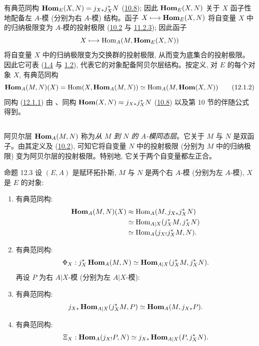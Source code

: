 有典范同构
$\operatorname{\mathbf{Hom}}_E(X,N)=j_{X\ast}j^{\ast}_XN$
(\hyperref[IV.cor10.8]{10.8}); 因此 $\operatorname{\mathbf{Hom}}_E(X,N)$ 关于 $X$ 函子性地配备左 $A$-模 (分别为右 $A$-模) 结构。函子 $X\longmapsto\operatorname{\mathbf{Hom}}_E(X,N)$ 将自变量 $X$ 中的归纳极限变为 $A$-模的投射极限 (\hyperref[IV.subsec10.2]{10.2} 与 \hyperref[IV.subsubsec11.2.3]{11.2.3}); 因此函子
$$
X\longmapsto \operatorname{Hom}_A(M,\operatorname{\mathbf{Hom}}_E(X,N))
$$
将自变量 $X$ 中的归纳极限\pageoriginale 变为交换群的投射极限, 从而变为底集合的投射极限。因此它可表 (\hyperref[IV.prop1.4]{1.4} 与 \hyperref[IV.theo1.2]{1.2}), 代表它的对象配备阿贝尔层结构。按定义, 对 $E$ 的每个对象 $X$, 有典范同构
\begin{equation*}
\operatorname{\mathbf{Hom}}_A(M,N)(X)=\operatorname{Hom}(X,\operatorname{\mathbf{Hom}}_A(M,N))\simeq
\operatorname{Hom}_A(M,\operatorname{\mathbf{Hom}}(X,N))\tag{12.1.2}
\end{equation*}
同构 (\hyperref[IV.eq12.1.1]{12.1.1}) 由 、同构 $\operatorname{\mathbf{Hom}}(X,N)\approx j_{X\ast}j^{\ast}_XN$ (\hyperref[IV.cor10.8]{10.8}) 以及第 10 节的伴随公式得到。

\setcounter{subsection}{1}
\subsection{}
阿贝尔层 $\operatorname{\mathbf{Hom}}_A(M,N)$ 称为\emph{从 $M$ 到 $N$ 的 $A$-模同态层}。它关于 $M$ 与 $N$ 是双函子。由其定义及 (\hyperref[IV.subsec10.2]{10.2}), 可知它将自变量 $N$ 中的投射极限 (分别为 $M$ 中的归纳极限) 变为阿贝尔层的投射极限。特别地, 它关于两个自变量都左正合。

\begin{enonce*}{命题 12.3}
设 $(E,A)$ 是赋环拓扑斯, $M$ 与 $N$ 是两个右 $A$-模 (分别为左 $A$-模), $X$ 是 $E$ 的对象:
\begin{enumerate}
\renewcommand{\theenumi}{\alph{enumi}}
\renewcommand{\labelenumi}{\theenumi)}
\item 有典范同构:
$$
\begin{aligned}
\operatorname{\mathbf{Hom}}_A(M,N)(X)&\approx \operatorname{Hom}_A(M, j_{X\ast}j^{\ast}_XN)\\
&\simeq\operatorname{Hom}_{A| X}(j^{\ast}_XM, j^{\ast}_XN)\\
&\simeq\operatorname{Hom}_A(j_{X!}j^{\ast}_XM, N).
\end{aligned}
$$

\item 有典范同构:
$$
\Phi_X:j^{\ast}_X\operatorname{\mathbf{Hom}}_A(M,N)\simeq
\operatorname{\mathbf{Hom}}_{A| X}(j^{\ast}_XM,j^{\ast}_XN).
$$
再设 $P$ 为右 $A|X$-模 (分别为左 $A|X$-模):

\item 有典范同构:
$$
j_{X\ast}\operatorname{\mathbf{Hom}}_{A| X}(j^{\ast}_XM,P)\simeq
\operatorname{\mathbf{Hom}}_A(M,j_{X\ast}P).
$$

\item 有典范同构:
$$
\Xi_X:\operatorname{\mathbf{Hom}}_A(j_{X!}P,N)\simeq j_{X\ast}\operatorname{\mathbf{Hom}}_{A|X}
(P,j^{\ast}_XN).
$$
\end{enumerate}
\end{enonce*}

